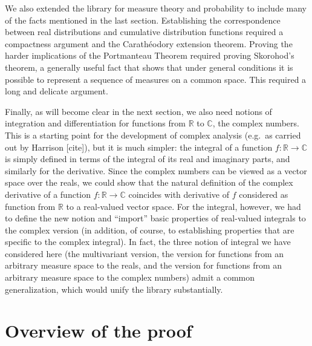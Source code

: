 \documentclass{article}
\newcommand{\RR}{\mathbb{R}}
\newcommand{\CC}{\mathbb{C}}
\begin{document}
We also extended the library for measure theory and probability to include many of the facts mentioned in the last section. Establishing the correspondence between real distributions and cumulative distribution functions 
required a compactness argument and the Carath\'eodory extension theorem. Proving the harder implications of the Portmanteau Theorem required proving Skorohod's theorem, a generally useful fact that shows that under general conditions it is possible to represent a sequence of measures on a common space. This required a long and delicate argument.

Finally, as will become clear in the next section, we also need notions of integration and differentiation for functions from $\RR$ to $\CC$, the complex numbers. This is a starting point for the development of complex analysis (e.g.~as carried out by Harrison [cite]), but it is much simpler: the integral of a function $f : \RR \to \CC$ is simply defined in terms of the integral of its real and imaginary parts, and similarly for the derivative. Since the complex numbers can be viewed as a vector space over the reals, we could show that the natural definition of the complex derivative of a function $f : \RR \to \CC$ coincides with derivative of $f$ considered as function from $\RR$ to a real-valued vector space. For the integral, however, we had to define the new notion and ``import'' basic properties of real-valued integrals to the complex version (in addition, of course, to establishing properties that are specific to the complex integral). In fact, the three notion of integral we have considered here (the multivariant version, the version for functions from an arbitrary measure space to the reals, and the version for functions from an arbitrary measure space to the complex numbers) admit a common generalization, which would unify the library substantially. 


\section{Overview of the proof}
\end{document}
